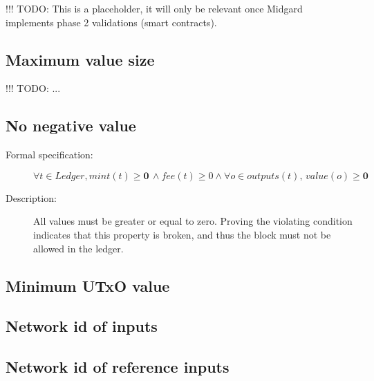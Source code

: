 \documentclass[../midgard.tex]{subfiles}
\begin{document}
!!! TODO: This is a placeholder, it will only be relevant once Midgard implements phase 2 validations (smart contracts).

\subsection{Maximum value size}
\label{rule:maximum-value-size}

!!! TODO: ...

\subsection{No negative value}
\label{rule:no-negative-value}

\begin{description}

\item[Formal specification:]
\begin{equation*}
    \forall t \in Ledger, mint(t) \geq \mathbf{0} \, \land fee(t) \geq 0 \land \forall o \in outputs(t), \, value(o) \geq \mathbf{0}
\end{equation*}
                
\item[Description:] All values must be greater or equal to zero.
  Proving the violating condition indicates that this property is broken, and thus the block must not be allowed in the ledger.
        
\end{description}


\subsection{Minimum UTxO value}
\label{rule:minimum-utxo-value}

\subsection{Network id of inputs}
\label{rule:network-id-of-inputs}

\subsection{Network id of reference inputs}
\label{rule:network-id-of-reference-inputs}

\end{document}
